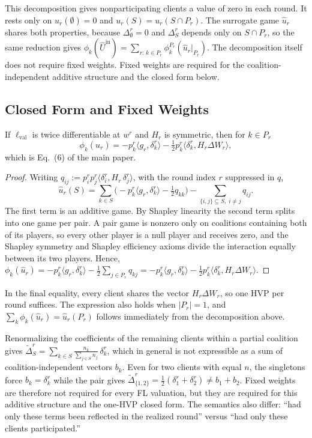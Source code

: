 \documentclass[letterpaper]{article} %
\providecommand{\lval}{\ell_{\mathrm{val}}}
\theoremstyle{definition}
\begin{document}
This decomposition gives nonparticipating clients a value of zero in each
round. It rests only on $u_r(\emptyset) = 0$ and $u_r(S) = u_r(S \cap P_r)$.
The surrogate game $\hat u_r$ shares both properties, because
$\Delta_\emptyset^r = 0$ and $\Delta_S^r$ depends only on $S \cap P_r$, so the
same reduction gives
$\phi_k(\hat U^{\mathrm{in}}) = \sum_{r:\,k \in P_r} \phi_k^{P_r}(\hat u_r|_{P_r})$.
The decomposition itself does not require fixed weights. Fixed weights
are required for the coalition-independent additive structure and the closed
form below.

\subsection{Closed Form and Fixed Weights}
\label{app:closed}

\begin{proposition}
\label{thm:closed}
If $\lval$ is twice differentiable at $w^r$ and $H_r$ is symmetric, then for
$k \in P_r$
\[
\phi_k(\hat u_r)
= -p_k^r \langle g_r, \delta_k^r\rangle
- \tfrac12 p_k^r \langle \delta_k^r, H_r \Delta W_r\rangle,
\]
which is Eq.~(6) of the main paper.
\end{proposition}

\begin{proof}
Writing $q_{ij} := p_i^r p_j^r\langle \delta_i^r, H_r\, \delta_j^r\rangle$,
with the round index $r$ suppressed in $q$,
\[
\hat u_r(S)
= \sum_{k \in S}\Big(-p_k^r\langle g_r, \delta_k^r\rangle - \tfrac12 q_{kk}\Big)
- \sum_{\{i,j\} \subseteq S,\; i \ne j} q_{ij}.
\]
The first term is an additive game. By Shapley linearity the second term splits
into one game per pair. A pair game is nonzero only on coalitions containing
both of its players, so every other player is a null player and receives zero,
and the Shapley symmetry and Shapley efficiency axioms divide the interaction
equally between its two players. Hence,
$\phi_k(\hat u_r) = -p_k^r\langle g_r, \delta_k^r\rangle
- \tfrac12 \sum_{j \in P_r} q_{kj}
= -p_k^r\langle g_r, \delta_k^r\rangle - \tfrac12 p_k^r\langle \delta_k^r, H_r \Delta W_r\rangle$.
\end{proof}

In the final equality, every client shares the vector $H_r \Delta W_r$, so one
HVP per round suffices. The expression also holds when
$|P_r| = 1$, and $\sum_k \phi_k(\hat u_r) = \hat u_r(P_r)$ follows
immediately from the decomposition above.

Renormalizing the coefficients of the remaining clients within a partial
coalition gives
$\widetilde\Delta_S^r
= \sum_{k \in S} \frac{n_k}{\sum_{j \in S} n_j}\, \delta_k^r$,
which in general is not expressible as a sum of coalition-independent vectors
$b_k$. Even for two clients with equal $n$, the singletons force
$b_k = \delta_k^r$ while the pair gives
$\widetilde\Delta_{\{1,2\}}^r = \tfrac12(\delta_1^r + \delta_2^r) \ne b_1 + b_2$.
Fixed weights are therefore not required for every FL valuation, but they are
required for this additive structure and the one-HVP closed form. The
semantics also differ: ``had only these terms been reflected in the realized
round'' versus ``had only these clients participated.''
\end{document}
